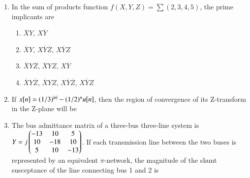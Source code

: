 \documentclass[journal,12pt,onecolumn]{IEEEtran}
\theoremstyle{remark}
\begin{document}
\begin{enumerate}[start=1, label=Q.\arabic*]
\item In the sum of products function $f(X,Y,Z)=\sum(2,3,4,5)$, the prime implicants are

\begin{enumerate}
    \item $\overline{X}Y$, $X\overline{Y}$
    \item $\overline{X}Y$, $X\overline{Y}\overline{Z}$, $X\overline{Y}Z$
    \item $\overline{X}Y\overline{Z}$, $\overline{X}YZ$, $X\overline{Y}$
    \item $\overline{X}Y\overline{Z}$, $\overline{X}YZ$, $X\overline{Y}\overline{Z}$, $X\overline{Y}Z$
\end{enumerate}
\hfill{}

\item If $x[n]=(1/3)^{\left\vert n\right\vert}-(1/2)^{n}u[n]$, then the region of convergence  of its Z-transform in the Z-plane will be

\begin{enumerate}
\end{enumerate}
\hfill{}

\item The bus admittance matrix of a three-bus three-line system is $Y=j\begin{pmatrix}-13 & 10 & 5 \\ 10 & -18 & 10 \\ 5 & 10 & -13\end{pmatrix}$. If each transmission line between the two buses is represented by an equivalent $\pi$-network, the magnitude of the shunt susceptance of the line connecting bus 1 and 2 is

\begin{enumerate}
\end{enumerate}
\hfill{}


\end{enumerate}
\end{document}
